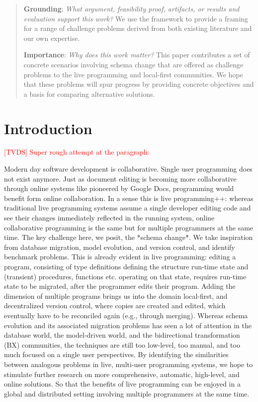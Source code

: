 \documentclass[english,submission]{programming}
\begin{document}
\begin{abstract}
\noindent\textbf{Grounding}: \emph{What argument, feasibility proof, artifacts, or results and evaluation support this work?}
We use the framework to provide a framing for a range of challenge problems derived from both
existing literature and our own expertise.

\noindent\textbf{Importance}: \emph{Why does this work matter?}
This paper contributes a set of concrete scenarios involving schema change that are offered as
challenge problems to the live programming and local-first communities. We hope that these
problems will spur progress by providing concrete objectives and a basis for comparing alternative
solutions.

\end{abstract}

\section{Introduction}

\textcolor{red}{[TVDS] Super rough attempt at the paragraph:}



Modern day software development is collaborative. Single user programming does not exist anymore.
Just as document editing is becoming more collaborative through online systems like pioneered by Google Docs,
programming would benefit form online collaboration. In a sense this is live programming++: whereas traditional
live programming systems assume a single developer editing code and see their changes immediately reflected
in the running system, online collaborative programming is the same but for multiple programmers at the same time.
The key challenge here, we posit, the *schema change*. We take inspiration from database migration,
model evolution, and version control, and identify benchmark problems. This is already evident in live programming:
editing a program, consisting of type definitions defining the structure run-time state and (transient) procedures, functions
etc. operating on that state, requires run-time state to be migrated, after the programmer edits their program.
Adding the dimension of multiple programs brings us into the domain local-first, and decentralized version control, where 
copies are created and edited, which eventually have to be reconciled again (e.g., through merging). 
Whereas schema evolution and its associated migration problems has seen a lot of attention in the database world,
the model-driven world, and the bidirectional transformation (BX) communities, the techniques are still too low-level,
too manual, and too much focused on a single user perspectives. By identifying the similarities between analogous
problems in live, multi-user programming systems, we hope to stimulate further research on more comprehensive, automatic, 
high-level, and online solutions. So that the benefits of live programming can be enjoyed in a global and distributed setting
involving multiple programmers at the same time. 
\end{document}
